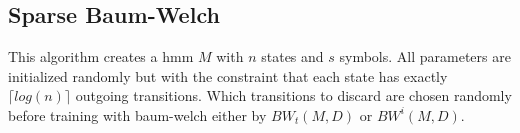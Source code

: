 \subsection{Sparse Baum-Welch}
This algorithm creates a \gls{hmm} $M$ with $n$ states and $s$ symbols.
All parameters are initialized randomly but with the constraint that each state has exactly $\lceil log(n) \rceil$ outgoing transitions.
Which transitions to discard are chosen randomly before training with \gls{baum-welch} either by $BW_t(M, D)$ or $BW^i(M, D)$.